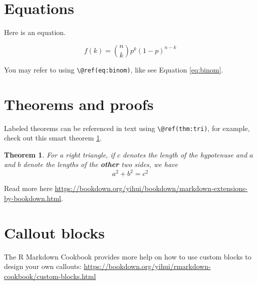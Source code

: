 \documentclass[
]{book}
\newtheorem{theorem}{Theorem}[chapter]
\theoremstyle{definition}
\theoremstyle{definition}
\theoremstyle{definition}
\theoremstyle{definition}
\theoremstyle{remark}
\begin{document}
\hypertarget{equations}{%
\section{Equations}\label{equations}}

Here is an equation.

\begin{equation} 
  f\left(k\right) = \binom{n}{k} p^k\left(1-p\right)^{n-k}
  \label{eq:binom}
\end{equation}

You may refer to using \texttt{\textbackslash{}@ref(eq:binom)}, like see Equation \eqref{eq:binom}.

\hypertarget{theorems-and-proofs}{%
\section{Theorems and proofs}\label{theorems-and-proofs}}

Labeled theorems can be referenced in text using \texttt{\textbackslash{}@ref(thm:tri)}, for example, check out this smart theorem \ref{thm:tri}.

\begin{theorem}
\protect\hypertarget{thm:tri}{}\label{thm:tri}For a right triangle, if \(c\) denotes the \emph{length} of the hypotenuse
and \(a\) and \(b\) denote the lengths of the \textbf{other} two sides, we have
\[a^2 + b^2 = c^2\]
\end{theorem}

Read more here \url{https://bookdown.org/yihui/bookdown/markdown-extensions-by-bookdown.html}.

\hypertarget{callout-blocks}{%
\section{Callout blocks}\label{callout-blocks}}

The R Markdown Cookbook provides more help on how to use custom blocks to design your own callouts: \url{https://bookdown.org/yihui/rmarkdown-cookbook/custom-blocks.html}

  
\end{document}
